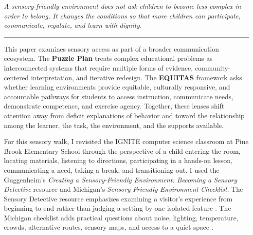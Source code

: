 \documentclass[11pt]{article}
\newcommand{\reviewsection}[1]{\vspace{0.07in}\noindent{\normalsize\bfseries\color{PrimaryRed}#1}\par\vspace{0.02in}}
\begin{document}
\begin{titlepage}
\vfill

\begin{center}
\begin{minipage}{0.92\textwidth}
\centering\itshape
A sensory-friendly environment does not ask children to become less complex in order to belong. It changes the conditions so that more children can participate, communicate, regulate, and learn with dignity.\\
{\color{PrimaryRed}\rule{4in}{0.8pt}}
\end{minipage}
\end{center}

\vfill

\begin{center}
\begin{minipage}{0.95\textwidth}
\small
This paper examines sensory access as part of a broader communication ecosystem. The \textbf{Puzzle Plan} treats complex educational problems as interconnected systems that require multiple forms of evidence, community-centered interpretation, and iterative redesign. The \textbf{EQUITAS} framework asks whether learning environments provide equitable, culturally responsive, and accountable pathways for students to access instruction, communicate needs, demonstrate competence, and exercise agency. Together, these lenses shift attention away from deficit explanations of behavior and toward the relationship among the learner, the task, the environment, and the supports available.
\end{minipage}
\end{center}

\restoregeometry
\end{titlepage}
\hypersetup{pageanchor=true}

\reviewsection{Purpose and Method}

For this sensory walk, I revisited the IGNITE computer science classroom at Pine Brook Elementary School through the perspective of a child entering the room, locating materials, listening to directions, participating in a hands-on lesson, communicating a need, taking a break, and transitioning out. I used the Guggenheim's \textit{Creating a Sensory-Friendly Environment: Becoming a Sensory Detective} resource and Michigan's \textit{Sensory-Friendly Environment Checklist}. The Sensory Detective resource emphasizes examining a visitor's experience from beginning to end rather than judging a setting by one isolated feature \citep{guggenheim_sensory}. The Michigan checklist adds practical questions about noise, lighting, temperature, crowds, alternative routes, sensory maps, and access to a quiet space \citep{mddi_checklist}.
\end{document}
